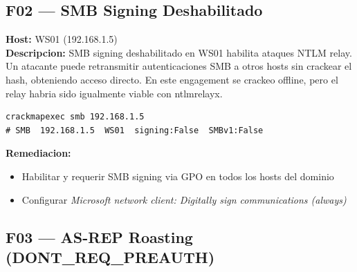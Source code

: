 \documentclass[11pt,a4paper]{article}
\begin{document}
\vspace{0.4cm}

\subsection{F02 --- SMB Signing Deshabilitado}

\begin{tcolorbox}[colback=high!6, colframe=high, boxrule=1pt, arc=3pt,
  title={\textbf{F02 $\cdot$ SMB Signing Deshabilitado} \hfill \textbf{CVSS 7.5 --- High}},
  fonttitle=\bfseries\color{white}, coltitle=white, colbacktitle=high, breakable]

\textbf{Host:} WS01 (192.168.1.5)\\[4pt]

\textbf{Descripcion:}
SMB signing deshabilitado en WS01 habilita ataques NTLM relay.
Un atacante puede retransmitir autenticaciones SMB a otros hosts sin crackear
el hash, obteniendo acceso directo. En este engagement se crackeo offline,
pero el relay habria sido igualmente viable con ntlmrelayx.

\begin{lstlisting}
crackmapexec smb 192.168.1.5
# SMB  192.168.1.5  WS01  signing:False  SMBv1:False
\end{lstlisting}

\textbf{Remediacion:}
\begin{itemize}[noitemsep]
  \item Habilitar y requerir SMB signing via GPO en todos los hosts del dominio
  \item Configurar \textit{Microsoft network client: Digitally sign communications (always)}
\end{itemize}
\end{tcolorbox}

\vspace{0.4cm}

\subsection{F03 --- AS-REP Roasting (DONT\_REQ\_PREAUTH)}
\end{document}
